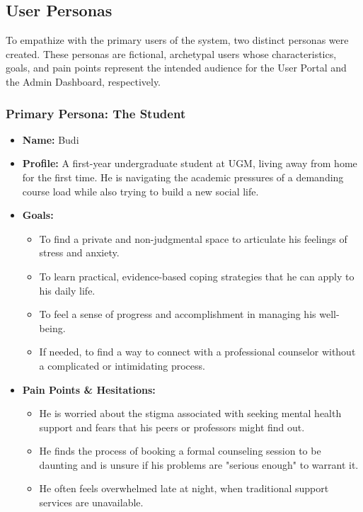 \subsection{User Personas}

To empathize with the primary users of the system, two distinct personas were created. These personas are fictional, archetypal users whose characteristics, goals, and pain points represent the intended audience for the User Portal and the Admin Dashboard, respectively.

\subsubsection{Primary Persona: The Student}
\begin{itemize}
    \item \textbf{Name:} Budi
    \item \textbf{Profile:} A first-year undergraduate student at UGM, living away from home for the first time. He is navigating the academic pressures of a demanding course load while also trying to build a new social life.
    \item \textbf{Goals:}
        \begin{itemize}
            \item To find a private and non-judgmental space to articulate his feelings of stress and anxiety.
            \item To learn practical, evidence-based coping strategies that he can apply to his daily life.
            \item To feel a sense of progress and accomplishment in managing his well-being.
            \item If needed, to find a way to connect with a professional counselor without a complicated or intimidating process.
        \end{itemize}
    \item \textbf{Pain Points \& Hesitations:}
        \begin{itemize}
            \item He is worried about the stigma associated with seeking mental health support and fears that his peers or professors might find out.
            \item He finds the process of booking a formal counseling session to be daunting and is unsure if his problems are "serious enough" to warrant it.
            \item He often feels overwhelmed late at night, when traditional support services are unavailable.
        \end{itemize}
\end{itemize}

